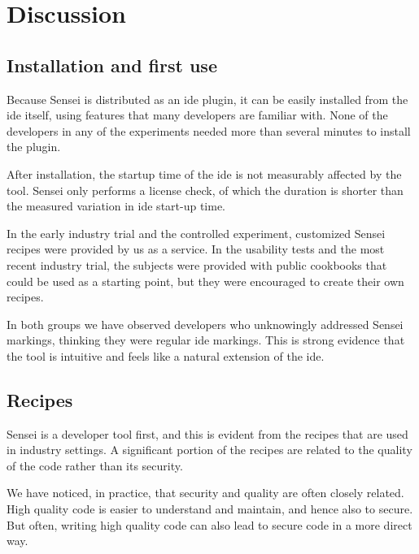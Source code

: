 \section{Discussion}
\label{sec:eval-sensei}
\subsection{Installation and first use}
Because Sensei is distributed as an \gls{ide} plugin, it can be easily installed from the \gls{ide} itself, using features that many developers are familiar with.
None of the developers in any of the experiments needed more than several minutes to install the plugin.

After installation, the startup time of the \gls{ide} is not measurably affected by the tool.
Sensei only performs a license check, of which the duration is shorter than the measured variation in \gls{ide} start-up time.

In the early industry trial and the controlled experiment, customized Sensei recipes were provided by us as a service.
In the usability tests and the most recent industry trial, the subjects were provided with public cookbooks that could be used as a starting point, but they were encouraged to create their own recipes.

In both groups we have observed developers who unknowingly addressed Sensei markings, thinking they were regular \gls{ide} markings.
This is strong evidence that the tool is intuitive and feels like a natural extension of the \gls{ide}.

\subsection{Recipes}
Sensei is a developer tool first, and this is evident from the recipes that are used in industry settings.
A significant portion of the recipes are related to the quality of the code rather than its security.

We have noticed, in practice, that security and quality are often closely related.
High quality code is easier to understand and maintain, and hence also to secure.
But often, writing high quality code can also lead to secure code in a more direct way.

